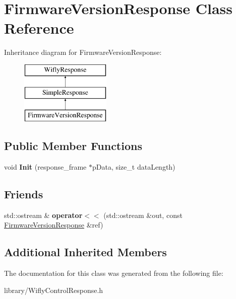 \hypertarget{class_firmware_version_response}{\section{Firmware\-Version\-Response Class Reference}
\label{class_firmware_version_response}
}
Inheritance diagram for Firmware\-Version\-Response\-:\begin{figure}[H]
\begin{center}
\leavevmode
\includegraphics[height=3.000000cm]{class_firmware_version_response}
\end{center}
\end{figure}
\subsection*{Public Member Functions}
\begin{DoxyCompactItemize}
\item 
\hypertarget{class_firmware_version_response_a2abdf257bd1d7fb5c4cf9a005068173e}{void {\bfseries Init} (response\-\_\-frame $\ast$p\-Data, size\-\_\-t data\-Length)}\label{class_firmware_version_response_a2abdf257bd1d7fb5c4cf9a005068173e}

\end{DoxyCompactItemize}
\subsection*{Friends}
\begin{DoxyCompactItemize}
\item 
\hypertarget{class_firmware_version_response_a37b570544d9c72195251b87e598a0451}{std\-::ostream \& {\bfseries operator$<$$<$} (std\-::ostream \&out, const \hyperlink{class_firmware_version_response}{Firmware\-Version\-Response} \&ref)}\label{class_firmware_version_response_a37b570544d9c72195251b87e598a0451}

\end{DoxyCompactItemize}
\subsection*{Additional Inherited Members}


The documentation for this class was generated from the following file\-:\begin{DoxyCompactItemize}
\item 
library/Wifly\-Control\-Response.\-h\end{DoxyCompactItemize}
